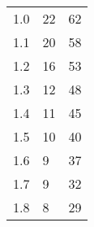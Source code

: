 \begin{table}[H]
{\begin{tabular}{|l|l|l|}
1.0                      & 22                                                                                                                  & 62                                                                                                                 \\
1.1                      & 20                                                                                                                  & 58                                                                                                                 \\
1.2                      & 16                                                                                                                  & 53                                                                                                                 \\
1.3                      & 12                                                                                                                  & 48                                                                                                                 \\
1.4                      & 11                                                                                                                  & 45                                                                                                                 \\
1.5                      & 10                                                                                                                  & 40                                                                                                                 \\
1.6                      & 9                                                                                                                   & 37                                                                                                                 \\
1.7                      & 9                                                                                                                   & 32                                                                                                                 \\
1.8                      & 8                                                                                                                   & 29                                                                                                                 \\

\end{tabular}}
\end{table}
